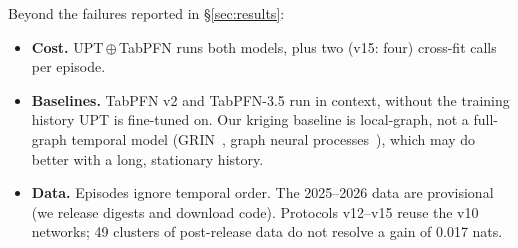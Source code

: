 Beyond the failures reported in \S\ref{sec:results}:
\begin{itemize}
  \item \textbf{Cost.} UPT\,$\oplus$\,TabPFN runs both models, plus two (v15: four) cross-fit calls per episode.
  \item \textbf{Baselines.} TabPFN v2 and TabPFN-3.5 run in context, without the training history UPT is fine-tuned
  on. Our kriging baseline is local-graph, not a full-graph temporal model (GRIN~\citep{cini2022grin}, graph neural
  processes~\citep{hu2023stgnp}), which may do better with a long, stationary history.
  \item \textbf{Data.} Episodes ignore temporal order. The 2025--2026 data are provisional (we release digests and
  download code). Protocols v12--v15 reuse the v10 networks; 49 clusters of post-release data do not resolve a gain
  of 0.017 nats.
\end{itemize}
